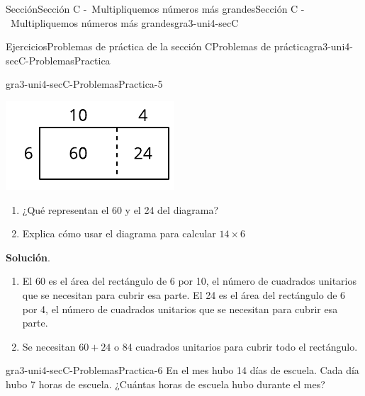 \documentclass[oneside,10pt,]{article}
\newcommand{\blocktitlefont}{\relax}
\begin{document}
\begin{sectionptx}{Sección}{Sección C -~Multipliquemos números más grandes}{}{Sección C -~Multipliquemos números más grandes}{}{}{gra3-uni4-secC}
\begin{exercises-subsection}{Ejercicios}{Problemas de práctica de la sección C}{}{Problemas de práctica}{}{}{gra3-uni4-secC-ProblemasPractica}
\begin{divisionexercise}{3}{}{}{gra3-uni4-secC-ProblemasPractica-5}%
\begin{sidebyside}{2}{0.0125}{0.0125}{0.025}%
\begin{sbspanel}{0.35}%
\includegraphics[width=\linewidth]{external/svg-source/tikz-file-151678-scale13.pdf}
\end{sbspanel}%
\begin{sbspanel}{0.6}%
%
\begin{enumerate}[label={(\alph*)}]
\item{}¿Qué representan el 60 y el 24 del diagrama?%
\item{}Explica cómo usar el diagrama para calcular \(14 \times 6\)%
\end{enumerate}
\end{sbspanel}%
\end{sidebyside}%
\par\smallskip%
\noindent\textbf{\blocktitlefont Solución}.\hypertarget{gra3-uni4-secC-ProblemasPractica-5-2}{}\quad{}%
\begin{enumerate}[label={(\alph*)}]
\item{}El 60 es el área del rectángulo de 6 por 10, el número de cuadrados unitarios que se necesitan para cubrir esa parte. El 24 es el área del rectángulo de 6 por 4, el número de cuadrados unitarios que se necesitan para cubrir esa parte.%
\item{}Se necesitan \(60 + 24\) o 84 cuadrados unitarios para cubrir todo el rectángulo.%
\end{enumerate}
\end{divisionexercise}%
\begin{divisionexercise}{4}{}{}{gra3-uni4-secC-ProblemasPractica-6}%
En el mes hubo 14 días de escuela. Cada día hubo 7 horas de escuela. ¿Cuántas horas de escuela hubo durante el mes?%
\par\smallskip%

\end{divisionexercise}
\end{exercises-subsection}
\end{sectionptx}
\end{document}
